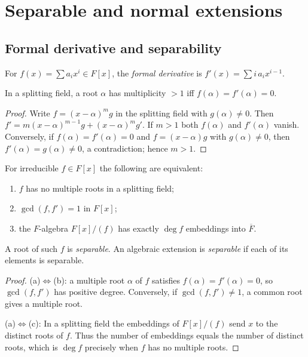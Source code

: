 \section{Separable and normal extensions}\label{sec:sep-normal}

\subsection{Formal derivative and separability}
\begin{definition}
For $f(x)=\sum a_i x^i\in F[x]$, the \emph{formal derivative} is $f'(x)=\sum i\,a_i x^{i-1}$.
\end{definition}
\begin{proposition}[Multiplicity]
In a splitting field, a root $\alpha$ has multiplicity $>1$ iff $f(\alpha)=f'(\alpha)=0$.
\end{proposition}
\begin{proof}
Write $f=(x-\alpha)^m g$ in the splitting field with $g(\alpha)\ne0$. Then
\(f' = m(x-\alpha)^{m-1} g + (x-\alpha)^m g'\). If $m>1$ both $f(\alpha)$ and
$f'(\alpha)$ vanish. Conversely, if $f(\alpha)=f'(\alpha)=0$ and $f=(x-\alpha)g$
with $g(\alpha)\ne0$, then $f'(\alpha)=g(\alpha)\ne0$, a contradiction; hence
$m>1$.
\end{proof}
\begin{theorem}\label{thm:sep-criteria}
For irreducible $f\in F[x]$ the following are equivalent:
\begin{enumerate}[label=(\alph*)]
\item $f$ has no multiple roots in a splitting field;
\item $\gcd(f,f')=1$ in $F[x]$;
\item the $F$-algebra $F[x]/(f)$ has exactly $\deg f$ embeddings into $\overline{F}$.
\end{enumerate}
A root of such $f$ is \emph{separable}. An algebraic extension is \emph{separable} if each of its elements is separable.
\end{theorem}
\begin{proof}
(a)$\Leftrightarrow$(b): a multiple root $\alpha$ of $f$ satisfies
$f(\alpha)=f'(\alpha)=0$, so $\gcd(f,f')$ has positive degree. Conversely, if
$\gcd(f,f')\ne1$, a common root gives a multiple root.

(a)$\Leftrightarrow$(c): In a splitting field the embeddings of $F[x]/(f)$ send
$x$ to the distinct roots of $f$. Thus the number of embeddings equals the number
of distinct roots, which is $\deg f$ precisely when $f$ has no multiple roots.
\end{proof}
